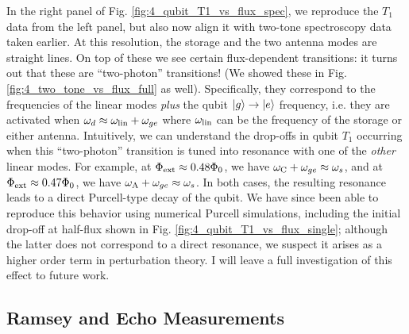 In the right panel of Fig. \ref{fig:4_qubit_T1_vs_flux_spec}, we reproduce the $T_1$ data from the left panel, but also now align it with two-tone spectroscopy data taken earlier. At this resolution, the storage and the two antenna modes are straight lines. On top of these we see certain flux-dependent transitions: it turns out that these are ``two-photon'' transitions! (We showed these in Fig. \ref{fig:4_two_tone_vs_flux_full} as well). Specifically, they correspond to the frequencies of the linear modes \textit{plus} the qubit $\lvert g\rangle\to\lvert e\rangle$ frequency, i.e. they are activated when $\omega_d \approx \omega_{\rm lin} + \omega_{ge}$ where $\omega_{\rm lin}$ can be the frequency of the storage or either antenna. Intuitively, we can understand the drop-offs in qubit $T_1$ occurring when this ``two-photon'' transition is tuned into resonance with one of the \textit{other} linear modes. For example, at $\Phi_{\rm ext} \approx 0.48\Phi_0$, we have $\omega_{\rm C} + \omega_{ge} \approx \omega_{s}$, and at $\Phi_{\rm ext} \approx 0.47\Phi_0$, we have $\omega_{\rm A} + \omega_{ge} \approx \omega_{s}$. In both cases, the resulting resonance leads to a direct Purcell-type decay of the qubit. We have since been able to reproduce this behavior using numerical Purcell simulations, including the initial drop-off at half-flux shown in Fig. \ref{fig:4_qubit_T1_vs_flux_single}; although the latter does not correspond to a direct resonance, we suspect it arises as a higher order term in perturbation theory. I will leave a full investigation of this effect to future work. 

\subsection{Ramsey and Echo Measurements}

